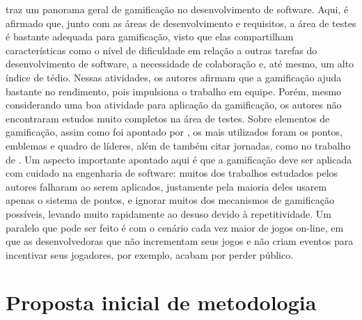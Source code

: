 \documentclass[twoside,english,brazilian]{UNISINOSartigo}
\begin{document}
\cite{Pedreira} traz um panorama geral de gamificação no desenvolvimento de software. Aqui, é afirmado que, junto com as áreas de desenvolvimento e requisitos, a área de testes é bastante adequada para gamificação, visto que elas compartilham características como o nível de dificuldade em relação a outras tarefas do desenvolvimento de software, a necessidade de colaboração e, até mesmo, um alto índice de tédio. Nessas atividades, os autores afirmam que a gamificação ajuda bastante no rendimento, pois impulsiona o trabalho em equipe. Porém, mesmo considerando uma boa atividade para aplicação da gamificação, os autores não encontraram estudos muito completos na área de testes. Sobre elementos de gamificação, assim como foi apontado por \cite{DeJesus}, os mais utilizados foram os pontos, emblemas e quadro de líderes, além de também citar jornadas, como no trabalho de \cite{Houshmand}. Um aspecto importante apontado aqui é que a gamificação deve ser aplicada com cuidado na engenharia de software: muitos dos trabalhos estudados pelos autores falharam ao serem aplicados, justamente pela maioria deles usarem apenas o sistema de pontos, e ignorar muitos dos mecanismos de gamificação possíveis, levando muito rapidamente ao desuso devido à repetitividade. Um paralelo que pode ser feito é com o cenário cada vez maior de jogos on-line, em que as desenvolvedoras que não incrementam seus jogos e não criam eventos para incentivar seus jogadores, por exemplo, acabam por perder público. 



\section{Proposta inicial de metodologia}

\end{document}
